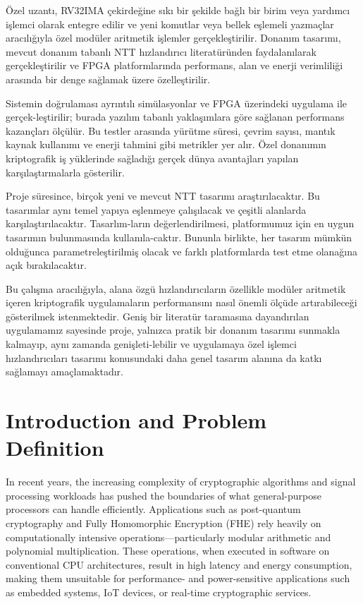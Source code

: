 \documentclass[a4paper, 12pt, titlepage]{article}
\begin{document}
Özel uzantı, RV32IMA çekirdeğine sıkı bir şekilde bağlı bir birim veya yardımcı işlemci olarak entegre edilir ve yeni komutlar veya bellek eşlemeli yazmaçlar aracılığıyla özel modüler aritmetik işlemler gerçekleştirilir. Donanım tasarımı, mevcut donanım tabanlı NTT hızlandırıcı literatüründen faydalanılarak gerçekleştirilir ve FPGA platformlarında performans, alan ve enerji verimliliği arasında bir denge sağlamak üzere özelleştirilir.

Sistemin doğrulaması ayrıntılı simülasyonlar ve FPGA üzerindeki uygulama ile gerçek-leştirilir; burada yazılım tabanlı yaklaşımlara göre sağlanan performans kazançları ölçülür. Bu testler arasında yürütme süresi, çevrim sayısı, mantık kaynak kullanımı ve enerji tahmini gibi metrikler yer alır. Özel donanımın kriptografik iş yüklerinde sağladığı gerçek dünya avantajları yapılan karşılaştırmalarla gösterilir.

Proje süresince, birçok yeni ve mevcut NTT tasarımı araştırılacaktır. Bu tasarımlar aynı temel yapıya eşlenmeye çalışılacak ve çeşitli alanlarda karşılaştırılacaktır. Tasarlım-ların değerlendirilmesi, platformumuz için en uygun tasarımın bulunmasında kullanıla-caktır. Bununla birlikte, her tasarım mümkün olduğunca parametreleştirilmiş olacak ve farklı platformlarda test etme olanağına açık bırakılacaktır.

Bu çalışma aracılığıyla, alana özgü hızlandırıcıların özellikle modüler aritmetik içeren kriptografik uygulamaların performansını nasıl önemli ölçüde artırabileceği gösterilmek istenmektedir. Geniş bir literatür taramasına dayandırılan uygulamamız sayesinde proje, yalnızca pratik bir donanım tasarımı sunmakla kalmayıp, aynı zamanda genişleti-lebilir ve uygulamaya özel işlemci hızlandırıcıları tasarımı konusundaki daha genel tasarım alanına da katkı sağlamayı amaçlamaktadır.

\newpage
\tableofcontents
\newpage

\section{Introduction and Problem Definition}

In recent years, the increasing complexity of cryptographic algorithms and signal processing workloads has pushed the boundaries of what general-purpose processors can handle efficiently. Applications such as post-quantum cryptography and Fully Homomorphic Encryption (FHE) rely heavily on computationally intensive operations—particularly modular arithmetic and polynomial multiplication. These operations, when executed in software on conventional CPU architectures, result in high latency and energy consumption, making them unsuitable for performance- and power-sensitive applications such as embedded systems, IoT devices, or real-time cryptographic services.
\end{document}
